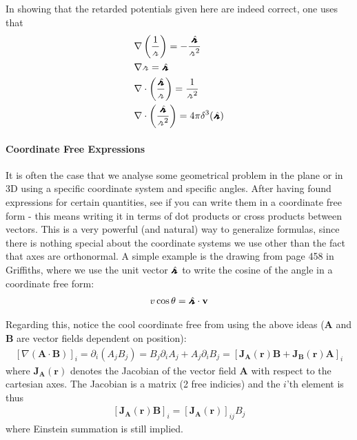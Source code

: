 In showing that the retarded potentials given here are indeed correct, one uses that \begin{align*}
    &\nabla \left( \frac{1}{\griffr[2] } \right) = - \frac{\hatgriffr }{\griffr[2] ^{2} }\\
    &\nabla \griffr[2] = \hatgriffr \\
    &\nabla \cdot \left( \frac{\hatgriffr }{\griffr[2] } \right) = \frac{1}{\griffr[2] ^{2} }\\
    &\nabla \cdot \left( \frac{\hatgriffr }{\griffr[2] ^{2} } \right) = 4 \pi \delta^3 (\hatgriffr )
\end{align*}

\paragraph{Coordinate Free Expressions}
It is often the case that we analyse some geometrical problem in the plane or in 3D using a specific coordinate system and specific angles. After having found expressions for certain quantities, see if you can write them in a coordinate free form - this means writing it in terms of dot products or cross products between vectors. This is a very powerful (and natural) way to generalize formulas, since there is nothing special about the coordinate systems we use other than the fact that axes are orthonormal. A simple example is the drawing from page 458 in Griffiths, where we use the unit vector \(\hatgriffr \) to write the cosine of the angle in a coordinate free form:
\begin{align*}
    v \cos \theta = \hatgriffr \cdot \mathbf{v}
\end{align*} 

Regarding this, notice the cool coordinate free from using the above ideas (\(\mathbf{A}\) and \(\mathbf{B}\) are vector fields dependent on position): \begin{align*}
    \left[  \nabla (\mathbf{A}\cdot \mathbf{B}) \right]_i = \partial _i \left( A_j B_j \right) = B_j \partial _i A_j + A_j \partial _i B_j = \left[\mathbf{J}_\mathbf{A}(\mathbf{r}) \mathbf{B} + \mathbf{J}_\mathbf{B}(\mathbf{r}) \mathbf{A}\right]_i
\end{align*}
where \(\mathbf{J}_\mathbf{A}(\mathbf{r})\) denotes the Jacobian of the vector field \(\mathbf{A}\) with respect to the cartesian axes. The Jacobian is a matrix (2 free indicies) and the \(i\)'th element is thus \begin{align*}
    \left[ \mathbf{J}_\mathbf{A}(\mathbf{r})\mathbf{B} \right] _i = \left[ \mathbf{J}_\mathbf{A}(\mathbf{r}) \right]_{ij} B_j
\end{align*} 
where Einstein summation is still implied.


